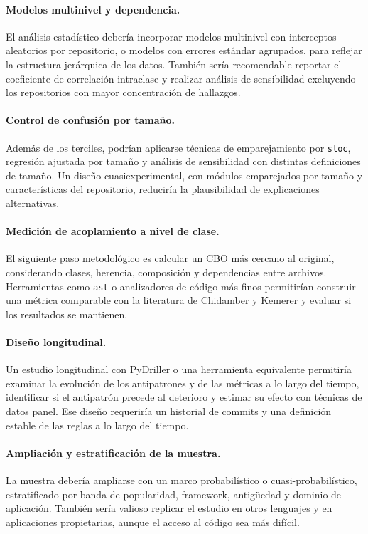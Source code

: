 \paragraph{Modelos multinivel y dependencia.} El análisis estadístico debería incorporar modelos multinivel con interceptos aleatorios por repositorio, o modelos con errores estándar agrupados, para reflejar la estructura jerárquica de los datos. También sería recomendable reportar el coeficiente de correlación intraclase y realizar análisis de sensibilidad excluyendo los repositorios con mayor concentración de hallazgos.

\paragraph{Control de confusión por tamaño.} Además de los terciles, podrían aplicarse técnicas de emparejamiento por \texttt{sloc}, regresión ajustada por tamaño y análisis de sensibilidad con distintas definiciones de tamaño. Un diseño cuasiexperimental, con módulos emparejados por tamaño y características del repositorio, reduciría la plausibilidad de explicaciones alternativas.

\paragraph{Medición de acoplamiento a nivel de clase.} El siguiente paso metodológico es calcular un CBO más cercano al original, considerando clases, herencia, composición y dependencias entre archivos. Herramientas como \texttt{ast} o analizadores de código más finos permitirían construir una métrica comparable con la literatura de Chidamber y Kemerer y evaluar si los resultados se mantienen.

\paragraph{Diseño longitudinal.} Un estudio longitudinal con PyDriller o una herramienta equivalente permitiría examinar la evolución de los antipatrones y de las métricas a lo largo del tiempo, identificar si el antipatrón precede al deterioro y estimar su efecto con técnicas de datos panel. Ese diseño requeriría un historial de commits y una definición estable de las reglas a lo largo del tiempo.

\paragraph{Ampliación y estratificación de la muestra.} La muestra debería ampliarse con un marco probabilístico o cuasi-probabilístico, estratificado por banda de popularidad, framework, antigüedad y dominio de aplicación. También sería valioso replicar el estudio en otros lenguajes y en aplicaciones propietarias, aunque el acceso al código sea más difícil.

